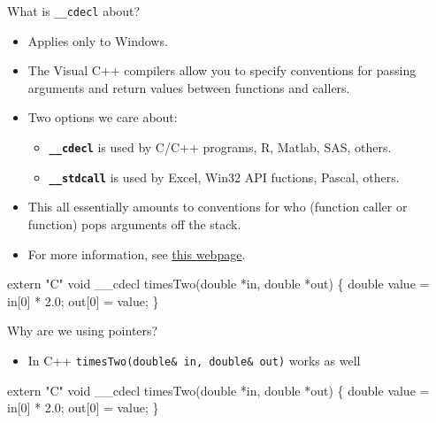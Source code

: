 \documentclass[ignorenonframetext,]{beamer}
\newenvironment{Shaded}{\begin{snugshade}}{\end{snugshade}}
\newcommand{\DataTypeTok}[1]{\textcolor[rgb]{0.13,0.29,0.53}{{#1}}}
\newcommand{\DecValTok}[1]{\textcolor[rgb]{0.00,0.00,0.81}{{#1}}}
\newcommand{\FloatTok}[1]{\textcolor[rgb]{0.00,0.00,0.81}{{#1}}}
\newcommand{\StringTok}[1]{\textcolor[rgb]{0.31,0.60,0.02}{{#1}}}
\newcommand{\NormalTok}[1]{{#1}}
\providecommand{\tightlist}{%
\setlength{\itemsep}{0pt}\setlength{\parskip}{0pt}}
\begin{document}
\begin{frame}[fragile]{What is \texttt{\_\_cdecl} about?}

\begin{itemize}
\tightlist
\item
  Applies only to Windows.
\item
  The Visual C++ compilers allow you to specify conventions for passing
  arguments and return values between functions and callers.
\item
  Two options we care about:

  \begin{itemize}
  \tightlist
  \item
    \textbf{\texttt{\_\_cdecl}} is used by C/C++ programs, R, Matlab,
    SAS, others.
  \item
    \textbf{\texttt{\_\_stdcall}} is used by Excel, Win32 API fuctions,
    Pascal, others.
  \end{itemize}
\item
  This all essentially amounts to conventions for who (function caller
  or function) pops arguments off the stack.
\item
  For more information, see
  \href{https://msdn.microsoft.com/en-us/library/984x0h58.aspx}{this
  webpage}.
\end{itemize}

\begin{Shaded}
\begin{Highlighting}[]
\DataTypeTok{extern} \StringTok{"C"} \DataTypeTok{void} \NormalTok{__cdecl }
  \NormalTok{timesTwo(}\DataTypeTok{double} \NormalTok{*in, }\DataTypeTok{double} \NormalTok{*out)}
\NormalTok{\{}
  \DataTypeTok{double} \NormalTok{value = in[}\DecValTok{0}\NormalTok{] * }\FloatTok{2.0}\NormalTok{;}
  \NormalTok{out[}\DecValTok{0}\NormalTok{] = value;}
\NormalTok{\}}
\end{Highlighting}
\end{Shaded}

\end{frame}

\begin{frame}[fragile]{Why are we using pointers?}

\begin{itemize}
\tightlist
\item
  In C++ \texttt{timesTwo(double\&\ in,\ double\&\ out)} works as well
\end{itemize}

\begin{Shaded}
\begin{Highlighting}[]
\DataTypeTok{extern} \StringTok{"C"} \DataTypeTok{void} \NormalTok{__cdecl }
  \NormalTok{timesTwo(}\DataTypeTok{double} \NormalTok{*in, }\DataTypeTok{double} \NormalTok{*out)}
\NormalTok{\{}
  \DataTypeTok{double} \NormalTok{value = in[}\DecValTok{0}\NormalTok{] * }\FloatTok{2.0}\NormalTok{;}
  \NormalTok{out[}\DecValTok{0}\NormalTok{] = value;}
\NormalTok{\}}
\end{Highlighting}
\end{Shaded}

\end{frame}
\end{document}
